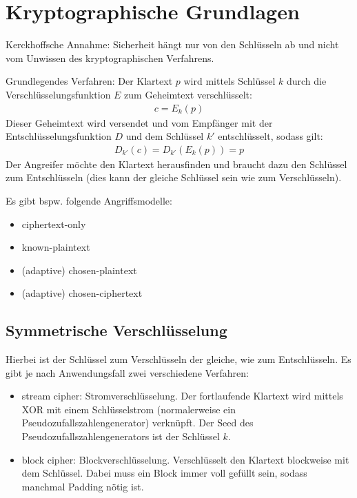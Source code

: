 \section{Kryptographische Grundlagen}%
\label{sec:kryptographische_grundlagen}

Kerckhoffsche Annahme: Sicherheit hängt nur von den Schlüsseln ab und nicht vom Unwissen
des kryptographischen Verfahrens.

Grundlegendes Verfahren:
Der Klartext $p$ wird mittels Schlüssel $k$ durch die Verschlüsselungsfunktion $E$ zum
Geheimtext verschlüsselt:
\begin{align*}
  c = E_k(p)
\end{align*}
Dieser Geheimtext wird versendet und vom Empfänger mit der Entschlüsselungsfunktion $D$
und dem Schlüssel $k'$ entschlüsselt, sodass gilt:
\begin{align*}
  D_{k'}(c) = D_{k'}(E_k(p)) = p
\end{align*}
Der Angreifer möchte den Klartext herausfinden und braucht dazu den Schlüssel zum
Entschlüsseln (dies kann der gleiche Schlüssel sein wie zum Verschlüsseln).

Es gibt bspw. folgende Angriffsmodelle:
\begin{itemize}
  \item ciphertext-only
  \item known-plaintext
  \item (adaptive) chosen-plaintext
  \item (adaptive) chosen-ciphertext
\end{itemize}

\subsection{Symmetrische Verschlüsselung}%
\label{sub:symmetrische_verschlusselung}

Hierbei ist der Schlüssel zum Verschlüsseln der gleiche, wie zum Entschlüsseln.
Es gibt je nach Anwendungsfall zwei verschiedene Verfahren:
\begin{itemize}
  \item stream cipher: Stromverschlüsselung.
    Der fortlaufende Klartext wird mittels XOR mit einem Schlüsselstrom
    (normalerweise ein Pseudozufallszahlengenerator) verknüpft.
    Der Seed des Pseudozufallszahlengenerators ist der Schlüssel $k$.
  \item block cipher: Blockverschlüsselung.
    Verschlüsselt den Klartext blockweise mit dem Schlüssel.
    Dabei muss ein Block immer voll gefüllt sein, sodass manchmal Padding nötig ist.
\end{itemize}

